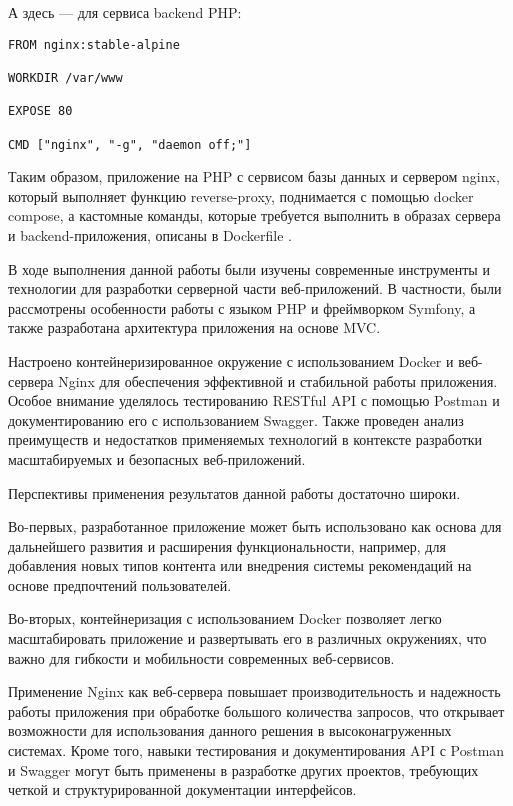 \documentclass[pract]{SCWorks}
\begin{document}
А здесь — для сервиса backend PHP:

\begin{verbatim}
FROM nginx:stable-alpine

WORKDIR /var/www

EXPOSE 80

CMD ["nginx", "-g", "daemon off;"]    
\end{verbatim}

Таким образом, приложение на PHP с сервисом базы данных и сервером nginx,
который выполняет функцию reverse-proxy, поднимается с помощью docker compose,
а кастомные команды, которые требуется выполнить в образах сервера и 
backend-приложения, описаны в Dockerfile \cite{docker} \cite{docker_docs}.

\conclusion

В ходе выполнения данной работы были изучены современные инструменты и 
технологии для разработки серверной части веб-приложений. В частности, 
были рассмотрены особенности работы с языком PHP и фреймворком Symfony, 
а также разработана архитектура приложения на основе MVC. 

Настроено контейнеризированное окружение с использованием Docker и веб-сервера 
Nginx для обеспечения эффективной и стабильной работы приложения. Особое 
внимание уделялось тестированию RESTful API с помощью Postman и 
документированию его с использованием Swagger. Также проведен анализ 
преимуществ и недостатков применяемых технологий в контексте разработки 
масштабируемых и безопасных веб-приложений. 

Перспективы применения результатов данной работы достаточно широки. 

Во-первых, разработанное приложение может быть использовано как основа 
для дальнейшего развития и расширения функциональности, например, для 
добавления новых типов контента или внедрения системы рекомендаций на 
основе предпочтений пользователей. 

Во-вторых, контейнеризация с использованием Docker позволяет легко 
масштабировать приложение и развертывать его в различных окружениях, 
что важно для гибкости и мобильности современных веб-сервисов. 

Применение Nginx как веб-сервера повышает производительность и надежность 
работы приложения при обработке большого количества запросов, что открывает 
возможности для использования данного решения в высоконагруженных системах. 
Кроме того, навыки тестирования и документирования API с Postman и Swagger 
могут быть применены в разработке других проектов, требующих четкой и 
структурированной документации интерфейсов.
\end{document}
